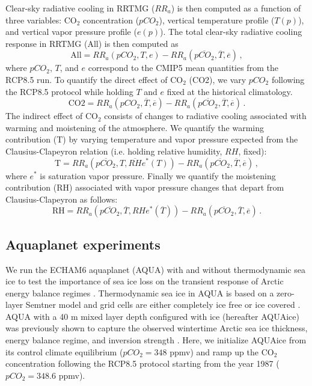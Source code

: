\documentclass[draft]{agujournal2019}
\begin{document}
Clear-sky radiative cooling in RRTMG ($RR_a$) is then computed as a function of three variables: CO$_2$ concentration ($pCO_2$), vertical temperature profile ($T(p)$), and vertical vapor pressure profile ($e(p)$). The total clear-sky radiative cooling response in RRTMG (All) is then computed as
\begin{equation}
    \mathrm{All} = RR_a(pCO_2, T, e) - RR_a(\overline{pCO_2}, \overline{T}, \overline{e})\, ,
\end{equation}
where $pCO_2$, $T$, and $e$ correspond to the CMIP5 mean quantities from the RCP8.5 run. To quantify the direct effect of CO$_2$ (CO2), we vary $pCO_2$ following the RCP8.5 protocol while holding $T$ and $e$ fixed at the historical climatology.
\begin{equation}
    \mathrm{CO2} = RR_a(pCO_2, \overline{T}, \overline{e}) - RR_a(\overline{pCO_2}, \overline{T}, \overline{e})\, .
\end{equation}
The indirect effect of CO$_2$ consists of changes to radiative cooling associated with warming and moistening of the atmosphere. We quantify the warming contribution (T) by varying temperature and vapor pressure expected from the Clausius-Clapeyron relation (i.e. holding relative humidity, $RH$, fixed):
\begin{equation}
    \mathrm{T} = RR_a(\overline{pCO_2}, T, \overline{RH}e^{\ast}(T)) - RR_a(\overline{pCO_2}, \overline{T}, \overline{e})\, ,
\end{equation}
where $e^\ast$ is saturation vapor pressure. Finally we quantify the moistening contribution (RH) associated with vapor pressure changes that depart from Clausius-Clapeyron as follows:
\begin{equation}
    \mathrm{RH} = RR_a(\overline{pCO_2}, \overline{T}, RHe^{\ast}(\overline{T})) - RR_a(\overline{pCO_2}, \overline{T}, \overline{e})\, .
\end{equation}

\subsection{Aquaplanet experiments}
We run the ECHAM6 aquaplanet (AQUA) with and without thermodynamic sea ice to test the importance of sea ice loss on the transient response of Arctic energy balance regimes \cite{stevens2013, shaw2020, shaw2022}. Thermodynamic sea ice in AQUA is based on a zero-layer Semtner model \cite{semtner1976} and grid cells are either completely ice free or ice covered \cite{giorgetta2013,salameh2018}. AQUA with a 40 m mixed layer depth configured with ice (hereafter AQUAice) was previously shown to capture the observed wintertime Arctic sea ice thickness, energy balance regime, and inversion strength \cite{miyawaki2022}. Here, we initialize AQUAice from its control climate equilibrium ($pCO_2=348$ ppmv) and ramp up the CO$_2$ concentration following the RCP8.5 protocol starting from the year 1987 ($pCO_2=348.6$ ppmv).
\end{document}

